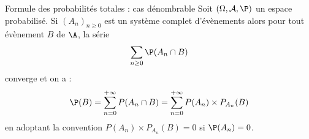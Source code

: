 \documentclass[a4paper,10pt]{report}
\begin{document}
\begin{enumerate}
\begin{Theoreme}{Formule des probabilités totales : cas dénombrable}
Soit $(\Omega, \mathcal{A}, \P)$ un espace probabilisé. Si $(A_n)_{n \geq 0}$ est un système complet d'évènements alors pour tout évènement $B$ de $\A$, la série 
$$ \sum_{n \geq 0} \P(A_n \cap B)$$
converge et on a :
$$ \P(B) = \sum_{n=0}^{+ \infty} P(A_n \cap B) = \sum_{n=0}^{+ \infty} P(A_n) \times P_{A_n}( B)$$
en adoptant la convention $P(A_n) \times P_{A_n}( B)=0$ si $\P(A_n)=0$.
\end{Theoreme}
%
\end{enumerate}
\end{document}
